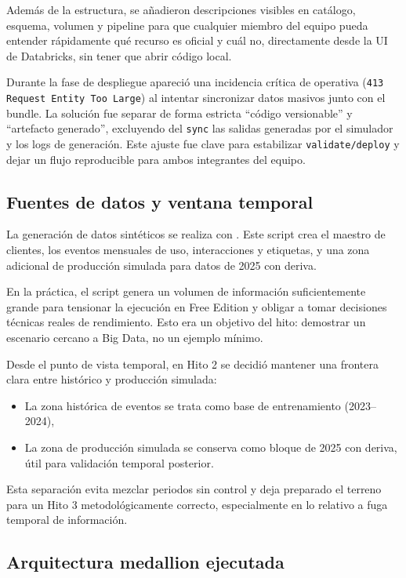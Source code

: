 \documentclass[12pt,a4paper]{article}
\begin{document}
Además de la estructura, se añadieron descripciones visibles en catálogo, esquema, volumen y pipeline para que cualquier miembro del equipo pueda entender rápidamente qué recurso es oficial y cuál no, directamente desde la UI de Databricks, sin tener que abrir código local.

Durante la fase de despliegue apareció una incidencia crítica de operativa (\texttt{413 Request Entity Too Large}) al intentar sincronizar datos masivos junto con el bundle. La solución fue separar de forma estricta ``código versionable'' y ``artefacto generado'', excluyendo del \texttt{sync} las salidas generadas por el simulador y los logs de generación. Este ajuste fue clave para estabilizar \texttt{validate/deploy} y dejar un flujo reproducible para ambos integrantes del equipo.

\subsection{Fuentes de datos y ventana temporal}

La generación de datos sintéticos se realiza con . Este script crea el maestro de clientes, los eventos mensuales de uso, interacciones y etiquetas, y una zona adicional de producción simulada para datos de 2025 con deriva.

En la práctica, el script genera un volumen de información suficientemente grande para tensionar la ejecución en Free Edition y obligar a tomar decisiones técnicas reales de rendimiento. Esto era un objetivo del hito: demostrar un escenario cercano a Big Data, no un ejemplo mínimo.

Desde el punto de vista temporal, en Hito 2 se decidió mantener una frontera clara entre histórico y producción simulada:
\begin{itemize}
    \item La zona histórica de eventos se trata como base de entrenamiento (2023--2024),
    \item La zona de producción simulada se conserva como bloque de 2025 con deriva, útil para validación temporal posterior.
\end{itemize}

Esta separación evita mezclar periodos sin control y deja preparado el terreno para un Hito 3 metodológicamente correcto, especialmente en lo relativo a fuga temporal de información.

\subsection{Arquitectura medallion ejecutada}
\end{document}

